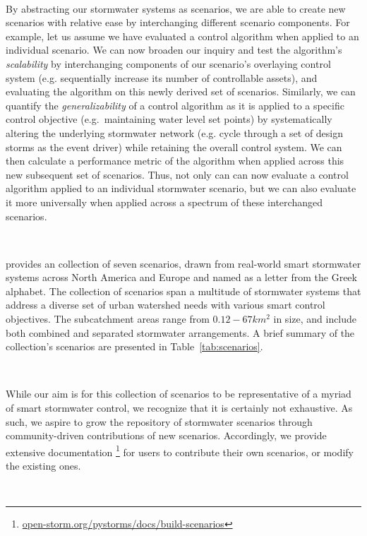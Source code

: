 \

By abstracting our stormwater systems as scenarios, we are able to create new scenarios with relative ease by interchanging different scenario components. For example, let us assume we have evaluated a control algorithm when applied to an individual scenario. We can now broaden our inquiry and test the algorithm's \emph{scalability} by interchanging components of our scenario's overlaying control system (e.g. sequentially increase its number of controllable assets), and evaluating the algorithm on this newly derived set of scenarios. Similarly, we can quantify the \emph{generalizability} of a control algorithm as it is applied to a specific control objective (e.g.\ maintaining water level set points) by systematically altering the underlying stormwater network (e.g. cycle through a set of design storms as the event driver) while retaining the overall control system. We can then calculate a performance metric of the algorithm when applied across this new subsequent set of scenarios. Thus, not only can can now evaluate a control algorithm applied to an individual stormwater scenario, but we can also evaluate it more universally when applied across a spectrum of these interchanged scenarios. 

\

\pystorms provides an collection of seven scenarios, drawn from real-world smart stormwater systems across North America and Europe and named as a letter from the Greek alphabet. The collection of scenarios span a multitude of stormwater systems that address a diverse set of urban watershed needs with various smart control objectives. The subcatchment areas range from $0.12 - 67 \unit{km^2}$ in size, and include both combined and separated stormwater arrangements. A brief summary of the collection's scenarios are presented in Table~\ref{tab:scenarios}.

\

While our aim is for this collection of scenarios to be representative of a myriad of smart stormwater control, we recognize that it is certainly not exhaustive. As such, we aspire to grow the \pystorms repository of stormwater scenarios through community-driven contributions of new scenarios. Accordingly, we provide extensive documentation \footnote{\href{https://www.pystorms.org/build/html/index.html}{open-storm.org/pystorms/docs/build-scenarios}} for users to contribute their own scenarios, or modify the existing ones. 

\

